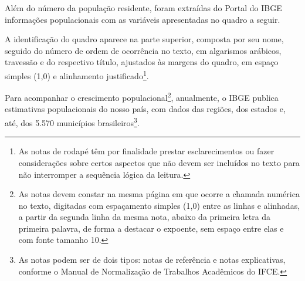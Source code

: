 Além do número da população residente, foram extraídas do Portal do IBGE informações populacionais com as variáveis apresentadas no quadro a seguir.

A identificação do quadro aparece na parte superior, composta por seu nome, seguido do número de ordem de ocorrência no texto, em algarismos arábicos, travessão e do respectivo título, ajustados às margens do quadro, em espaço simples (1,0) e alinhamento justificado\footnote{As notas de rodapé têm por finalidade prestar esclarecimentos ou fazer considerações sobre certos aspectos que não devem ser incluídos no texto para não interromper a sequência lógica da leitura.}.

\begin{quadro}[!ht]	
\centering
\label{qua:exemplo-1}
\end{quadro}

\newpage

Para acompanhar o crescimento populacional\footnote{As notas devem constar na mesma página em que ocorre a chamada numérica no texto, digitadas com espaçamento simples (1,0) entre as linhas e alinhadas, a partir da segunda linha da mesma nota, abaixo da primeira letra da primeira palavra, de forma a destacar o expoente, sem espaço entre elas e com fonte tamanho 10.}, anualmente, o IBGE publica estimativas populacionais do nosso país, com dados das regiões, dos estados e, até, dos 5.570 municípios brasileiros\footnote{As notas podem ser de dois tipos: notas de referência e notas explicativas, conforme o Manual de Normalização de Trabalhos Acadêmicos do IFCE.}. 